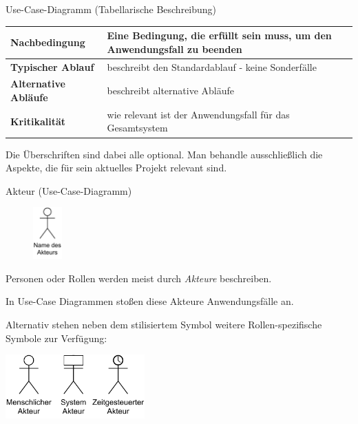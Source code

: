 \begin{diag}{Use-Case-Diagramm (Tabellarische Beschreibung)}
\begin{tabularx}{\textwidth}{|>{\bfseries}l|X|}
        Nachbedingung       & Eine Bedingung, die erfüllt sein muss, um den Anwendungsfall zu beenden                                                          \\\hline
        Typischer Ablauf    & beschreibt den Standardablauf - keine Sonderfälle                                                                                \\\hline
        Alternative Abläufe & beschreibt alternative Abläufe                                                                                                   \\\hline
        Kritikalität        & wie relevant ist der Anwendungsfall für das Gesamtsystem                                                                         \\\hline
    \end{tabularx}

    Die Überschriften sind dabei alle optional.
    Man behandle ausschließlich die Aspekte, die für sein aktuelles Projekt relevant sind.
\end{diag}

\begin{diag}{Akteur (Use-Case-Diagramm)}
    \begin{figure}
        \centering
        \includegraphics[width=0.1\textwidth]{includes/figures/defi_diagrams_use_case_akteur.pdf}
    \end{figure}
    Personen oder Rollen werden meist durch \emph{Akteure} beschreiben.

    In Use-Case Diagrammen stoßen diese Akteure Anwendungsfälle an.

    Alternativ stehen neben dem stilisiertem Symbol weitere Rollen-spezifische Symbole zur Verfügung:

    \begin{center}
        \includegraphics[width=0.4\textwidth]{includes/figures/defi_diagrams_use_case_akteur_types.pdf}
    \end{center}
\end{diag}


